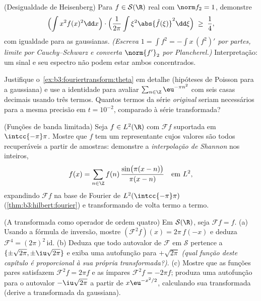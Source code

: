 \begin{exercise}[$\star\star\star$]\label{exo:b3:fouriertransform:8}
(Desigualdade de Heisenberg) Para $f \in \mathcal S(\R)$ real com $\norm f_2 = 1$, demonstre
\[
\Bigl(\int x^2f(x)^2\dd x\Bigr)\cdot
\Bigl(\frac1{2\pi}\int \xi^2\abs{\hat f(\xi)}^2\dd\xi\Bigr)
\;\geq\; \frac14 ,
\]
com igualdade para as gaussianas. \emph{(Escreva $1 = \int f^2 =
-\int x\,(f^2)'$ por partes,
limite por Cauchy--Schwarz e converta $\norm{f'}_2$ por Plancherel.)}
Interpretação: um sinal e seu espectro não podem estar ambos
concentrados.
\end{exercise}

\begin{exercise}[$\star\star$]\label{exo:b3:fouriertransform:9}
Justifique o~\cref{ex:b3:fouriertransform:theta} em detalhe (hipóteses de Poisson para a
gaussiana) e use a identidade para avaliar $\sum_{n\in\Z}\eu^{-\pi n^2}$ com seis casas
decimais usando três termos. Quantos termos da série \emph{original}
seriam necessários para a mesma precisão em $t = 10^{-2}$, comparado à série
transformada?
\end{exercise}

\begin{exercise}[$\star\star$]\label{exo:b3:fouriertransform:10}
(Funções de banda limitada) Seja $f \in L^2(\R)$ com $\mathcal Ff$ suportada em $\intcc{-\pi}\pi$.
Mostre que $f$ tem um representante cujos valores são todos
recuperáveis a partir de amostras: demonstre a \emph{interpolação de
Shannon} nos inteiros,
\[
f(x) = \sum_{n\in\Z} f(n)\,
\frac{\sin\bigl(\pi(x - n)\bigr)}{\pi(x - n)}
\quad\text{em } L^2,
\]
expandindo $\mathcal Ff$ na base de Fourier de $L^2(\intcc{-\pi}\pi)$ (\cref{thm:b3:hilbert:fourier}) e
transformando de volta termo a termo.
\end{exercise}

\begin{exercise}[$\star\star$]\label{exo:b3:fouriertransform:11}
(A transformada como operador de ordem quatro) Em $\mathcal
S(\R)$, seja $\mathcal F f = \hat f$.
(a) Usando a fórmula de inversão, mostre $(\mathcal F^2f)(x) =
2\pi\,f(-x)$ e deduza $\mathcal F^4 = (2\pi)^2\,
\mathrm{id}$.
(b) Deduza que todo autovalor de $\mathcal F$ em $\mathcal S$ pertence a $\{\pm\sqrt{2\pi},
\pm\iu\sqrt{2\pi}\}$ e exiba
uma autofunção para $+\sqrt{2\pi}$ \emph{(qual função deste capítulo é
proporcional à sua própria transformada?)}.
(c) Mostre que as funções pares satisfazem $\mathcal F^2f = 2\pi
f$ e as ímpares $\mathcal F^2f = -2\pi f$;
produza uma autofunção para o autovalor $-\iu\sqrt{2\pi}$ a partir de $x\eu^{-x^2/2}$,
calculando sua transformada (derive a transformada da gaussiana).
\end{exercise}

